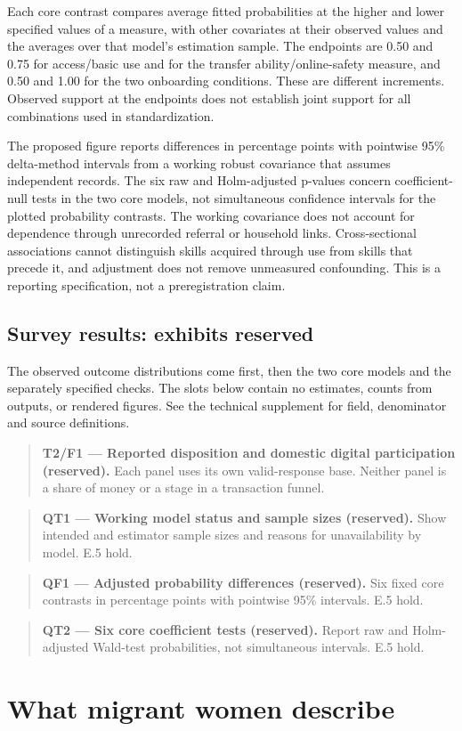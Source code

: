 \documentclass[12pt]{article}
\newcommand{\exhibitplaceholder}[3]{%
  \begin{quote}\small
    \textbf{#1 --- #2 (reserved).} #3
  \end{quote}%
}
\begin{document}
Each core contrast compares average fitted probabilities at the higher and lower specified values of a measure, with other covariates at their observed values and the averages over that model's estimation sample. The endpoints are 0.50 and 0.75 for access/basic use and for the transfer ability/online-safety measure, and 0.50 and 1.00 for the two onboarding conditions. These are different increments. Observed support at the endpoints does not establish joint support for all combinations used in standardization.

The proposed figure reports differences in percentage points with pointwise 95\% delta-method intervals from a working robust covariance that assumes independent records. The six raw and Holm-adjusted p-values concern coefficient-null tests in the two core models, not simultaneous confidence intervals for the plotted probability contrasts. The working covariance does not account for dependence through unrecorded referral or household links. Cross-sectional associations cannot distinguish skills acquired through use from skills that precede it, and adjustment does not remove unmeasured confounding. This is a reporting specification, not a preregistration claim.

\subsection{Survey results: exhibits reserved}
The observed outcome distributions come first, then the two core models and the separately specified checks. The slots below contain no estimates, counts from outputs, or rendered figures. See the technical supplement for field, denominator and source definitions.

\exhibitplaceholder{T2/F1}{Reported disposition and domestic digital participation}{Each panel uses its own valid-response base. Neither panel is a share of money or a stage in a transaction funnel.}
\exhibitplaceholder{QT1}{Working model status and sample sizes}{Show intended and estimator sample sizes and reasons for unavailability by model. E.5 hold.}
\exhibitplaceholder{QF1}{Adjusted probability differences}{Six fixed core contrasts in percentage points with pointwise 95\% intervals. E.5 hold.}
\exhibitplaceholder{QT2}{Six core coefficient tests}{Report raw and Holm-adjusted Wald-test probabilities, not simultaneous intervals. E.5 hold.}

\section{What migrant women describe}
\end{document}
